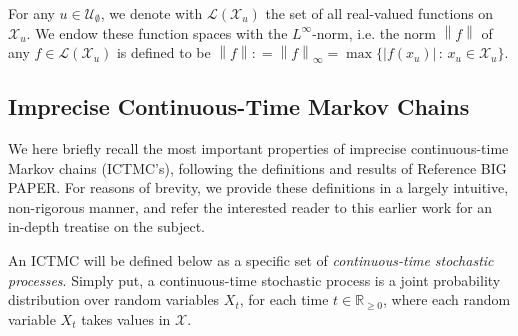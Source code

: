 \documentclass[twoside,11pt]{article}
\newcommand{\reals}{\mathbb{R}}
\newcommand{\realsnonneg}{\reals_{\geq 0}}
\newcommand{\states}{\mathcal{X}}
\newcommand{\gambles}{\mathcal{L}}
\newcommand{\norm}[1]{\left\lVert #1 \right\rVert}
\newcommand{\abs}[1]{\left\vert #1 \right\vert}
\newcommand{\coloneqq}{:\!=}
\begin{document}
For any $u\in\mathcal{U}_\emptyset$, we denote with $\gambles(\states_u)$ the set of all real-valued functions on $\states_u$. We endow these function spaces with the $L^\infty$-norm, i.e. the norm $\norm{f}$ of any $f\in\gambles(\states_u)$ is defined to be $\norm{f}\coloneqq\norm{f}_\infty=\max\{\abs{f(x_u)}\,:\,x_u\in\states_u\}$.

\subsection{Imprecise Continuous-Time Markov Chains}

We here briefly recall the most important properties of imprecise continuous-time Markov chains (ICTMC's), following the definitions and results of Reference BIG PAPER. For reasons of brevity, we provide these definitions in a largely intuitive, non-rigorous manner, and refer the interested reader to this earlier work for an in-depth treatise on the subject.

An ICTMC will be defined below as a specific set of \emph{continuous-time stochastic processes}. Simply put, a continuous-time stochastic process is a joint probability distribution over random variables $X_t$, for each time $t\in\realsnonneg$, where each random variable $X_t$ takes values in $\states$. 


\end{document}
